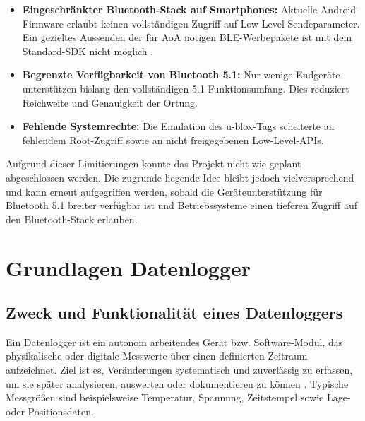 \documentclass[a4paper, 12pt]{article} %
\begin{document}
\begin{itemize}[leftmargin=2em]
  \item \textbf{Eingeschränkter Bluetooth-Stack auf Smartphones:} Aktuelle Android-Firmware erlaubt keinen vollständigen Zugriff auf Low-Level-Sendeparameter. Ein gezieltes Aussenden der für \ac{AoA} nötigen \ac{BLE}-Werbepakete ist mit dem Standard-\ac{SDK} nicht möglich \cite{androidBLElimitation}.
  \item \textbf{Begrenzte Verfügbarkeit von Bluetooth 5.1:} Nur wenige Endgeräte unterstützen bislang den vollständigen 5.1-Funktionsumfang. Dies reduziert Reichweite und Genauigkeit der Ortung.
  \item \textbf{Fehlende Systemrechte:} Die Emulation des u-blox-Tags scheiterte an fehlendem Root-Zugriff sowie an nicht freigegebenen Low-Level-\ac{API}s.
\end{itemize}

Aufgrund dieser Limitierungen konnte das Projekt nicht wie geplant abgeschlossen werden. Die zugrunde liegende Idee bleibt jedoch 
vielversprechend und kann erneut aufgegriffen werden, sobald die Geräteunterstützung für Bluetooth 5.1 breiter verfügbar ist und Betriebssysteme 
einen tieferen Zugriff auf den Bluetooth-Stack erlauben.

\clearpage

\section{Grundlagen Datenlogger}

\subsection{Zweck und Funktionalität eines Datenloggers}
Ein Datenlogger ist ein autonom arbeitendes Gerät bzw. Software-Modul, das physikalische oder digitale Messwerte über einen definierten Zeitraum 
aufzeichnet.  
Ziel ist es, Veränderungen systematisch und zuverlässig zu erfassen, um sie später analysieren, auswerten oder dokumentieren zu 
können \cite{poole2020data,smith2018sensors}.  
Typische Messgrößen sind beispielsweise Temperatur, Spannung, Zeitstempel sowie Lage- oder Positionsdaten.
\end{document}
